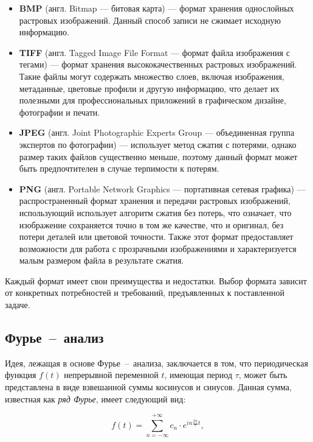 \begin{itemize}
        \item \textbf{BMP} (англ. Bitmap --- битовая карта) --- формат хранения однослойных растровых изображений. Данный способ записи не сжимает исходную информацию.
	\item \textbf{TIFF} (англ. Tagged Image File Format --- формат файла изображения с тегами) --- формат хранения высококачественных растровых изображений. Такие файлы могут содержать множество слоев, включая изображения, метаданные, цветовые профили и другую информацию, что делает их полезными для профессиональных приложений в графическом дизайне, фотографии и печати. 
	\item \textbf{JPEG} (англ. Joint Photographic Experts Group --- объединенная группа экспертов по фотографии) --- использует метод сжатия с потерями, однако размер таких файлов существенно меньше, поэтому данный формат может быть предпочтителен в случае терпимости к потерям.
	\item \textbf{PNG} (англ. Portable Network Graphics --- портативная сетевая графика) --- распространенный формат хранения и передачи растровых изображений, использующий использует алгоритм сжатия без потерь, что означает, что изображение сохраняется точно в том же качестве, что и оригинал, без потери деталей или цветовой точности. Также этот формат предоставляет возможности для работа с прозрачными изображениями и характеризуется малым размером файла в результате сжатия.
\end{itemize}

Каждый формат имеет свои преимущества и недостатки. Выбор формата зависит от конкретных потребностей и требований, предъявленных к поставленной задаче.

\clearpage

\subsection{Фурье~--~анализ}

Идея, лежащая в основе Фурье~--~анализа, заключается в том, что периодическая функция $f(t)$ непрерывной переменной $t$, имеющая период $\tau$, может быть представлена в виде взвешанной суммы косинусов и синусов. Данная сумма, известная как \textit{ряд Фурье}, имеет следующий вид:

\begin{equation}\label{ryad}
	f(t) = \sum_{n=-\infty}^{+\infty}c_n\cdot e^{in{\textstyle \frac{2\pi}{\tau}} t},
\end{equation}

